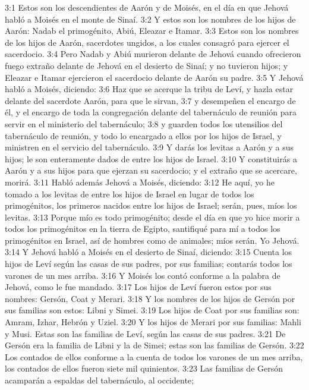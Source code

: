 3:1 Estos son los descendientes de Aarón y de Moisés, en el día en que Jehová habló a Moisés en el monte de Sinaí.  
3:2 Y estos son los nombres de los hijos de Aarón: Nadab el primogénito, Abiú, Eleazar e Itamar. 
3:3 Estos son los nombres de los hijos de Aarón, sacerdotes ungidos, a los cuales consagró para ejercer el sacerdocio. 
3:4 Pero Nadab y Abiú murieron delante de Jehová cuando ofrecieron fuego extraño delante de Jehová en el desierto de Sinaí; y no tuvieron hijos; y Eleazar e Itamar ejercieron el sacerdocio delante de Aarón su padre.  
3:5 Y Jehová habló a Moisés, diciendo:  
3:6 Haz que se acerque la tribu de Leví, y hazla estar delante del sacerdote Aarón, para que le sirvan,  
3:7 y desempeñen el encargo de él, y el encargo de toda la congregación delante del tabernáculo de reunión para servir en el ministerio del tabernáculo;  
3:8 y guarden todos los utensilios del tabernáculo de reunión, y todo lo encargado a ellos por los hijos de Israel, y ministren en el servicio del tabernáculo.  
3:9 Y darás los levitas a Aarón y a sus hijos; le son enteramente dados de entre los hijos de Israel.  
3:10 Y constituirás a Aarón y a sus hijos para que ejerzan su sacerdocio; y el extraño que se acercare, morirá.  
3:11 Habló además Jehová a Moisés, diciendo:  
3:12 He aquí, yo he tomado a los levitas de entre los hijos de Israel en lugar de todos los primogénitos, los primeros nacidos entre los hijos de Israel; serán, pues, míos los levitas.  
3:13 Porque mío es todo primogénito; desde el día en que yo hice morir a todos los primogénitos en la tierra de Egipto, santifiqué para mí a todos los primogénitos en Israel, así de hombres como de animales; míos serán. Yo Jehová.  
3:14 Y Jehová habló a Moisés en el desierto de Sinaí, diciendo:  
3:15 Cuenta los hijos de Leví según las casas de sus padres, por sus familias; contarás todos los varones de un mes arriba.  
3:16 Y Moisés los contó conforme a la palabra de Jehová, como le fue mandado.  
3:17 Los hijos de Leví fueron estos por sus nombres: Gersón, Coat y Merari.  
3:18 Y los nombres de los hijos de Gersón por sus familias son estos: Libni y Simei.  
3:19 Los hijos de Coat por sus familias son: Amram, Izhar, Hebrón y Uziel.  
3:20 Y los hijos de Merari por sus familias: Mahli y Musi. Estas son las familias de Leví, según las casas de sus padres.  
3:21 De Gersón era la familia de Libni y la de Simei; estas son las familias de Gersón.  
3:22 Los contados de ellos conforme a la cuenta de todos los varones de un mes arriba, los contados de ellos fueron siete mil quinientos.  
3:23 Las familias de Gersón acamparán a espaldas del tabernáculo, al occidente;  

